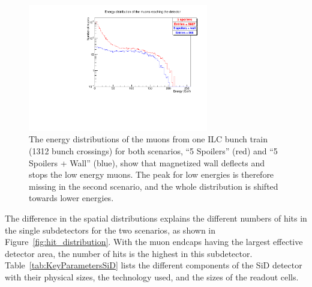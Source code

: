 \begin{figure}
    \centering
    \includegraphics[width=0.7\textwidth]{figures/muon_energy.pdf}
    \caption[Energy distribution of muons from the two shielding scenarios]{
    The energy distributions of the muons from one ILC bunch train (1312 bunch crossings) for both scenarios, ``5 Spoilers'' (red) and ``5 Spoilers + Wall'' (blue), show that magnetized wall deflects and stops the low energy muons.
    The peak for low energies is therefore missing in the second scenario, and the whole distribution is shifted towards lower energies.
    }
    \label{fig:muon_energy}
\end{figure}

The difference in the spatial distributions explains the different numbers of hits in the single subdetectors for the two scenarios, as shown in Figure~\ref{fig:hit_distribution}.
With the muon endcaps having the largest effective detector area, the number of hits is the highest in this subdetector.
Table~\ref{tab:KeyParametersSiD} lists the different components of the SiD detector with their physical sizes, the technology used, and the sizes of the readout cells.

